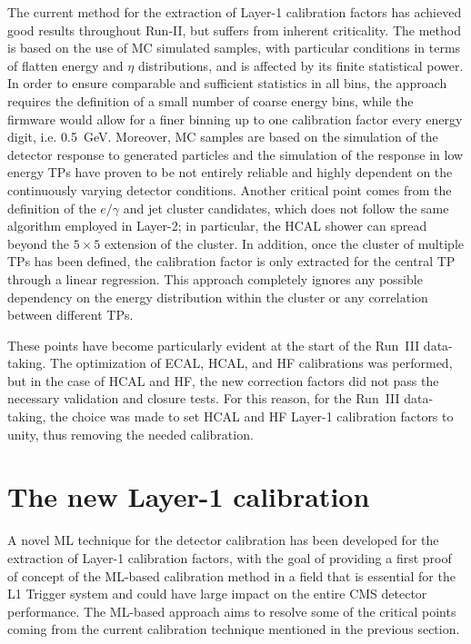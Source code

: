 \bigbreak

The current method for the extraction of Layer-1 calibration factors has achieved good results throughout Run-II, but suffers from inherent criticality. 
The method is based on the use of MC simulated samples, with particular conditions in terms of flatten energy and $\eta$ distributions, and is affected by its finite statistical power. 
In order to ensure comparable and sufficient statistics in all bins, the approach requires the definition of a small number of coarse energy bins, while the firmware would allow for a finer binning up to one calibration factor every energy digit, i.e. 0.5~GeV.
Moreover, MC samples are based on the simulation of the detector response to generated particles and the simulation of the response in low energy TPs have proven to be not entirely reliable and highly dependent on the continuously varying detector conditions.
Another critical point comes from the definition of the $e/\gamma$ and jet cluster candidates, which does not follow the same algorithm employed in Layer-2; in particular, the HCAL shower can spread beyond the $5\times5$ extension of the cluster.
In addition, once the cluster of multiple TPs has been defined, the calibration factor is only extracted for the central TP through a linear regression. This approach completely ignores any possible dependency on the energy distribution within the cluster or any correlation between different TPs.

These points have become particularly evident at the start of the Run~III data-taking. 
The optimization of ECAL, HCAL, and HF calibrations was performed, but in the case of HCAL and HF, the new correction factors did not pass the necessary validation and closure tests. 
For this reason, for the Run~III data-taking, the choice was made to set HCAL and HF Layer-1 calibration factors to unity, thus removing the needed calibration.

\section{The new Layer-1 calibration}

A novel ML technique for the detector calibration has been developed for the extraction of Layer-1 calibration factors, with the goal of providing a first proof of concept of the ML-based calibration method in a field that is essential for the L1 Trigger system and could have large impact on the entire CMS detector performance.
The ML-based approach aims to resolve some of the critical points coming from the current calibration technique mentioned in the previous section.

